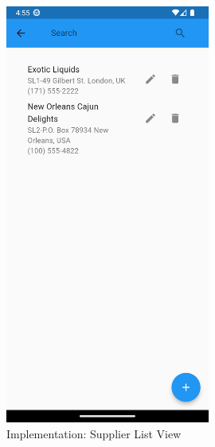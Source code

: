 \documentclass[../thesis.tex]{subfiles}
\begin{document}
\begin{figure}[H]
    \centering
    \includegraphics[width=0.60\textwidth]{images/SupplierScreen_List.png}
    \caption{Implementation: Supplier List View}
    \label{fig:SupplierScreen_List}
\end{figure}
\end{document}
